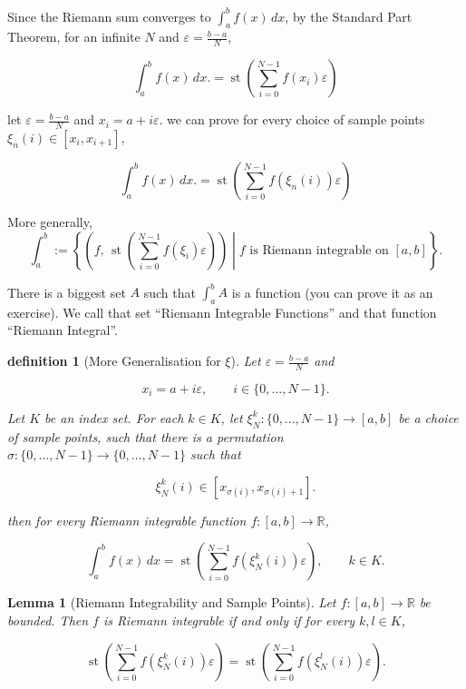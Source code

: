 \documentclass[10pt,a4paper]{book}
\newtheorem{definition}{definition}[section]
\newtheorem{lemma}{Lemma}[section]
\begin{document}
Since the Riemann sum converges to $\int_a^b f(x)\,dx$, by the Standard Part
Theorem, for an infinite $N$ and $\varepsilon=\frac{b-a}{N}$,

$$
    \int_a^b f(x)\,dx.
    =
    \operatorname{st}
    \left(
    \sum_{i=0}^{N-1}f(x_i)\varepsilon
    \right)
$$

let $\varepsilon=\frac{b-a}{N}$ and $x_i=a+i\varepsilon$. we can prove for
every choice of sample points $\xi_n (i) \in[x_i,x_{i+1}]$,

$$
    \int_a^b f(x)\,dx.
    =
    \operatorname{st}
    \left(
    \sum_{i=0}^{N-1}f(\xi_n (i))\varepsilon
    \right)
$$

More generally,
\[
    \int_a^b
    :=
    \left\{
    \left(
    f,\,
    \operatorname{st}
    \left(
    \sum_{i=0}^{N-1}
    f(\xi_i)\varepsilon
    \right)
    \right)
    \middle|
    f\text{ is Riemann integrable on }[a,b]
    \right\}.
\]

There is a biggest set $A$ such that $\int_a^b A$ is a function (you can prove
it as an exercise). We call that set ``Riemann Integrable Functions'' and that
function ``Riemann Integral''.

\begin{definition}[More Generalisation for $\xi$]
    Let $\varepsilon=\frac{b-a}{N}$ and

    $$
        x_i=a+i\varepsilon,\qquad i \in \{ 0,\ldots,N - 1 \}.
    $$

    Let $K$ be an index set. For each $k\in K$, let $\xi_N^k : \{ 0,\ldots,N - 1 \}
        \to [a,b]$ be a choice of sample points, such that there is a permutation
    $\sigma : \{ 0,\ldots,N - 1 \} \to \{ 0,\ldots,N - 1 \}$ such that

    $$
        \xi_N^k(i)\in[x_{\sigma(i)},x_{\sigma(i)+1}].
    $$

    then for every Riemann integrable function $f:[a,b]\to\mathbb{R}$,

    $$
        \int_a^b f(x)\,dx
        =
        \operatorname{st}\left(
        \sum_{i=0}^{N-1}f(\xi_N^k(i))\varepsilon
        \right),
        \qquad k\in K.
    $$

\end{definition}

\begin{lemma}[Riemann Integrability and Sample Points]
    Let $f:[a,b]\to\mathbb{R}$ be bounded. Then $f$ is Riemann integrable if and only if for every $k,l\in K$,

    $$
        \operatorname{st}\left(
        \sum_{i=0}^{N-1}f(\xi_N^k(i))\varepsilon
        \right)
        =
        \operatorname{st}\left(
        \sum_{i=0}^{N-1}f(\xi_N^l(i))\varepsilon
        \right).
    $$

\end{lemma}
\end{document}
